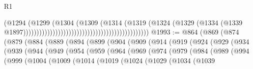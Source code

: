 \begin{lexlean}{R1}
\begin{coremodule}
                                                                              (@1294
                                                                                (@1299
                                                                                  (@1304
                                                                                    (@1309
                                                                                      (@1314
                                                                                        (@1319
                                                                                          (@1324
                                                                                            (@1329
                                                                                              (@1334
                                                                                                (@1339
                                                                                                  @1897)))))))))))))))))))))))))))))))))))))))))))))))
@1993 := @864
    (@869
      (@874
        (@879
          (@884
            (@889
              (@894
                (@899
                  (@904
                    (@909
                      (@914
                        (@919
                          (@924
                            (@929
                              (@934
                                (@939
                                  (@944
                                    (@949
                                      (@954
                                        (@959
                                          (@964
                                            (@969
                                              (@974
                                                (@979
                                                  (@984
                                                    (@989
                                                      (@994
                                                        (@999
                                                          (@1004
                                                            (@1009
                                                              (@1014
                                                                (@1019
                                                                  (@1024
                                                                    (@1029
                                                                      (@1034
                                                                        (@1039

\end{coremodule}
\end{lexlean}
